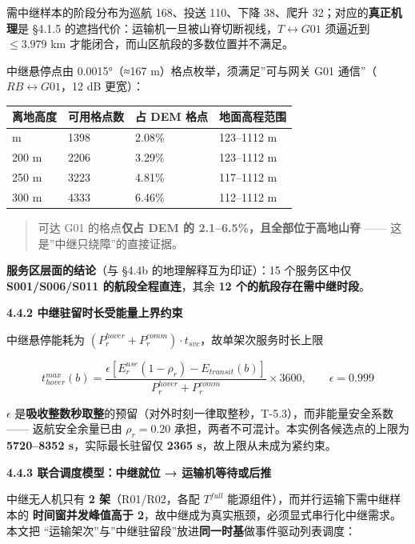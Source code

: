 \documentclass[
  10.5pt,
]{article}
\newcounter{none} %
\begin{document}
需中继样本的阶段分布为巡航 168、投送 110、下降 38、爬升
32；对应的\textbf{真正机理}是 §4.1.5
的遮挡代价：运输机一旦被山脊切断视线，\(T\leftrightarrow G01\) 须逼近到
\(\le 3.979\) km 才能闭合，而山区航段的多数位置并不满足。

中继悬停点由 0.0015°（≈167 m）格点枚举，须满足''可与网关 G01
通信''（\(RB\leftrightarrow G01\)，12 dB 更宽）：

{\def\LTcaptype{none} %
\begin{longtable}[]{@{}llll@{}}
\toprule\noalign{}
离地高度 & 可用格点数 & 占 DEM 格点 & 地面高程范围 \\
\midrule\noalign{}
\endhead
\bottomrule\noalign{}
\endlastfoot
150 m & 1398 & 2.08\% & 123--1112 m \\
200 m & 2206 & 3.29\% & 123--1112 m \\
250 m & 3223 & 4.81\% & 117--1112 m \\
300 m & 4333 & 6.46\% & 112--1112 m \\
\end{longtable}
}

\begin{quote}
可达 G01 的格点\textbf{仅占 DEM 的 2.1--6.5\%，且全部位于高地山脊}
------ 这是''中继只绕障''的直接证据。
\end{quote}

\textbf{服务区层面的结论}（与 §4.4b 的地理解释互为印证）：15
个服务区中仅 \textbf{S001/S006/S011 的航段全程直连}，其余 \textbf{12
个的航段存在需中继时段}。

\textbf{4.4.2 中继驻留时长受能量上界约束}

中继悬停能耗为
\((P^{hover}_r+P^{comm}_r)\cdot t_{svc}\)，故单架次服务时长上限

\[t^{max}_{hover}(b)=\frac{\epsilon\left[E^{use}_r(1-\rho_r)-E_{transit}(b)\right]}{P^{hover}_r+P^{comm}_r}\times 3600,\qquad \epsilon=0.999\]

\(\epsilon\)
是\textbf{吸收整数秒取整}的预留（对外时刻一律取整秒，T-5.3），而非能量安全系数------
返航安全余量已由 \(\rho_r=0.20\)
承担，两者不可混计。本实例各候选点的上限为 \textbf{5720--8352
s}，实际最长驻留仅 \textbf{2365 s}，故上限从未成为紧约束。

\textbf{4.4.3 联合调度模型：中继就位 → 运输机等待或后推}

中继无人机只有 \textbf{2 架}（R01/R02，各配 \(T^{full}\)
能源组件），而并行运输下需中继样本的 \textbf{时间窗并发峰值高于
2}，故中继成为真实瓶颈，必须显式串行化中继需求。本文把
``运输架次''与''中继驻留段''放进\textbf{同一时基}做事件驱动列表调度：
\end{document}
